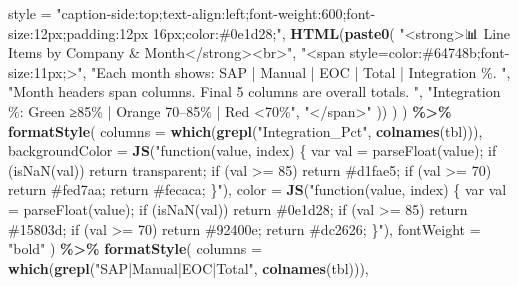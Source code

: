 \documentclass[
]{article}
\newenvironment{Shaded}{\begin{snugshade}}{\end{snugshade}}
\newcommand{\AttributeTok}[1]{\textcolor[rgb]{0.13,0.29,0.53}{#1}}
\newcommand{\FunctionTok}[1]{\textcolor[rgb]{0.13,0.29,0.53}{\textbf{#1}}}
\newcommand{\NormalTok}[1]{#1}
\newcommand{\SpecialCharTok}[1]{\textcolor[rgb]{0.81,0.36,0.00}{\textbf{#1}}}
\newcommand{\StringTok}[1]{\textcolor[rgb]{0.31,0.60,0.02}{#1}}
\begin{document}
\begin{Shaded}
\begin{Highlighting}[]
          \AttributeTok{style =} \StringTok{"caption{-}side:top;text{-}align:left;font{-}weight:600;font{-}size:12px;padding:12px 16px;color:\#0e1d28;"}\NormalTok{,}
          \FunctionTok{HTML}\NormalTok{(}\FunctionTok{paste0}\NormalTok{(}
            \StringTok{"\textless{}strong\textgreater{}📊 Line Items by Company \& Month\textless{}/strong\textgreater{}\textless{}br\textgreater{}"}\NormalTok{,}
            \StringTok{"\textless{}span style=\textquotesingle{}color:\#64748b;font{-}size:11px;\textquotesingle{}\textgreater{}"}\NormalTok{,}
            \StringTok{"Each month shows: SAP | Manual | EOC | Total | Integration \%. "}\NormalTok{,}
            \StringTok{"Month headers span columns. Final 5 columns are overall totals. "}\NormalTok{,}
            \StringTok{"Integration \%: Green ≥85\% | Orange 70–85\% | Red \textless{}70\%"}\NormalTok{,}
            \StringTok{"\textless{}/span\textgreater{}"}
\NormalTok{          ))}
\NormalTok{        )}
\NormalTok{      ) }\SpecialCharTok{\%\textgreater{}\%}
        \FunctionTok{formatStyle}\NormalTok{(}
          \AttributeTok{columns =} \FunctionTok{which}\NormalTok{(}\FunctionTok{grepl}\NormalTok{(}\StringTok{"Integration\_Pct"}\NormalTok{, }\FunctionTok{colnames}\NormalTok{(tbl))),}
          \AttributeTok{backgroundColor =} \FunctionTok{JS}\NormalTok{(}\StringTok{"function(value, index) \{}
\StringTok{            var val = parseFloat(value);}
\StringTok{            if (isNaN(val)) return \textquotesingle{}transparent\textquotesingle{};}
\StringTok{            if (val \textgreater{}= 85) return \textquotesingle{}\#d1fae5\textquotesingle{};}
\StringTok{            if (val \textgreater{}= 70) return \textquotesingle{}\#fed7aa\textquotesingle{};}
\StringTok{            return \textquotesingle{}\#fecaca\textquotesingle{};}
\StringTok{          \}"}\NormalTok{),}
          \AttributeTok{color =} \FunctionTok{JS}\NormalTok{(}\StringTok{"function(value, index) \{}
\StringTok{            var val = parseFloat(value);}
\StringTok{            if (isNaN(val)) return \textquotesingle{}\#0e1d28\textquotesingle{};}
\StringTok{            if (val \textgreater{}= 85) return \textquotesingle{}\#15803d\textquotesingle{};}
\StringTok{            if (val \textgreater{}= 70) return \textquotesingle{}\#92400e\textquotesingle{};}
\StringTok{            return \textquotesingle{}\#dc2626\textquotesingle{};}
\StringTok{          \}"}\NormalTok{),}
          \AttributeTok{fontWeight =} \StringTok{"bold"}
\NormalTok{        ) }\SpecialCharTok{\%\textgreater{}\%}
        \FunctionTok{formatStyle}\NormalTok{(}
          \AttributeTok{columns =} \FunctionTok{which}\NormalTok{(}\FunctionTok{grepl}\NormalTok{(}\StringTok{"SAP|Manual|EOC|Total"}\NormalTok{, }\FunctionTok{colnames}\NormalTok{(tbl))),}

\end{Highlighting}
\end{Shaded}
\end{document}
